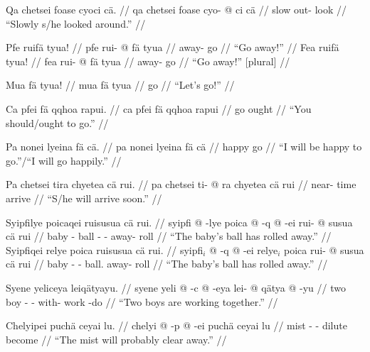 \documentclass{article}
\begin{document}
\ex[lingstyle=QuCheanya] \begingl
\glpreamble Qa chetsei foase cyoci c\"a. //
\gla qa chetsei foase cyo- @ ci c\"a //
\glb {}  slow out- look  //
\glft ``Slowly s/he looked around.'' //
\endgl \xe

\pex[lingstyle=QuCheanya] 
\a \begingl
\glpreamble Pfe ruif\"a tyua! //
\gla pfe rui- @ f\"a tyua //
\glb {} away- go  //
\glft ``Go away!'' //
\endgl 
\a \begingl
\glpreamble Fea ruif\"a tyua! //
\gla fea rui- @ f\"a tyua //
\glb {} away- go  //
\glft ``Go away!'' [plural] //
\endgl
\xe

\ex[lingstyle=QuCheanya] \begingl
\glpreamble Mua f\"a tyua! //
\gla mua f\"a tyua //
\glb {} go  //
\glft ``Let's go!'' //
\endgl \xe

\ex[lingstyle=QuCheanya] \begingl
\glpreamble Ca pfei f\"a qqhoa rapui. //
\gla ca pfei f\"a qqhoa rapui //
\glb {}  go  ought //
\glft ``You should/ought to go.'' //
\endgl \xe

\ex[lingstyle=QuCheanya] \begingl
\glpreamble Pa nonei lyeina f\"a c\"a. //
\gla pa nonei lyeina f\"a c\"a //
\glb {}  happy go  //
\glft ``I will be happy to go.''/``I will go happily.'' //
\endgl \xe

\ex[lingstyle=QuCheanya] \begingl
\glpreamble Pa chetsei tira chyetea c\"a rui. //
\gla pa chetsei ti- @ ra chyetea c\"a rui //
\glb {}  near- time arrive   //
\glft ``S/he will arrive soon.'' //
\endgl \xe

\pex[lingstyle=QuCheanya] 
\a \begingl
\glpreamble Syipfilye poicaqei ruisusua c\"a rui. //
\gla syipfi @ -lye poica @ -q @ -ei rui- @ susua c\"a rui //
\glb baby - ball - - away- roll   //
\glft ``The baby's ball has rolled away.'' //
\endgl
\a \begingl
\glpreamble Syipfiqei relye poica ruisusua c\"a rui. //
\gla syipfi$_i$ @ -q @ -ei relye$_i$ poica rui- @ susua c\"a rui //
\glb baby - -  ball. away- roll   //
\glft ``The baby's ball has rolled away.'' //
\endgl
\xe

\ex[lingstyle=QuCheanya] \begingl
\glpreamble Syene yeliceya leiq\"atyayu. //
\gla syene yeli @ -c @ -eya lei- @ q\"atya @ -yu //
\glb two boy - - with- work -do //
\glft ``Two boys are working together.'' //
\endgl \xe

\ex[lingstyle=QuCheanya] \begingl
\glpreamble Chelyipei puch\"a ceyai lu. //
\gla chelyi @ -p @ -ei puch\"a ceyai lu //
\glb mist - - dilute become  //
\glft ``The mist will probably clear away.'' //
\endgl \xe
\end{document}
